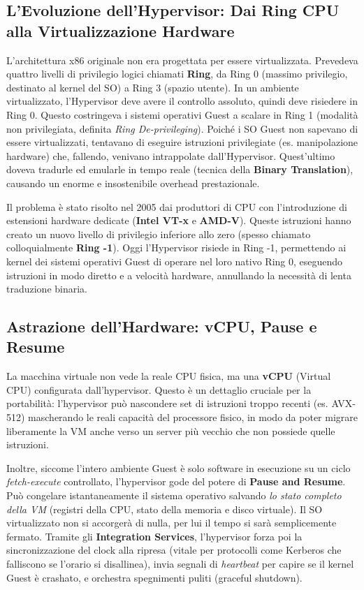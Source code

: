 \subsection{L'Evoluzione dell'Hypervisor: Dai Ring CPU alla Virtualizzazione Hardware}
L'architettura x86 originale non era progettata per essere virtualizzata. Prevedeva quattro livelli di privilegio logici chiamati \textbf{Ring}, da Ring 0 (massimo privilegio, destinato al kernel del SO) a Ring 3 (spazio utente). 
In un ambiente virtualizzato, l'Hypervisor deve avere il controllo assoluto, quindi deve risiedere in Ring 0. Questo costringeva i sistemi operativi Guest a scalare in Ring 1 (modalità non privilegiata, definita \textit{Ring De-privileging}). Poiché i SO Guest non sapevano di essere virtualizzati, tentavano di eseguire istruzioni privilegiate (es. manipolazione hardware) che, fallendo, venivano intrappolate dall'Hypervisor. Quest'ultimo doveva tradurle ed emularle in tempo reale (tecnica della \textbf{Binary Translation}), causando un enorme e insostenibile overhead prestazionale.

Il problema è stato risolto nel 2005 dai produttori di CPU con l'introduzione di estensioni hardware dedicate (\textbf{Intel VT-x} e \textbf{AMD-V}). Queste istruzioni hanno creato un nuovo livello di privilegio inferiore allo zero (spesso chiamato colloquialmente \textbf{Ring -1}). Oggi l'Hypervisor risiede in Ring -1, permettendo ai kernel dei sistemi operativi Guest di operare nel loro nativo Ring 0, eseguendo istruzioni in modo diretto e a velocità hardware, annullando la necessità di lenta traduzione binaria.

\subsection{Astrazione dell'Hardware: vCPU, Pause e Resume}
La macchina virtuale non vede la reale CPU fisica, ma una \textbf{vCPU} (Virtual CPU) configurata dall'hypervisor. Questo è un dettaglio cruciale per la portabilità: l'hypervisor può nascondere set di istruzioni troppo recenti (es. AVX-512) mascherando le reali capacità del processore fisico, in modo da poter migrare liberamente la VM anche verso un server più vecchio che non possiede quelle istruzioni. 

Inoltre, siccome l'intero ambiente Guest è solo software in esecuzione su un ciclo \textit{fetch-execute} controllato, l'hypervisor gode del potere di \textbf{Pause and Resume}. Può congelare istantaneamente il sistema operativo salvando \textit{lo stato completo della VM} (registri della CPU, stato della memoria e disco virtuale). Il SO virtualizzato non si accorgerà di nulla, per lui il tempo si sarà semplicemente fermato. 
Tramite gli \textbf{Integration Services}, l'hypervisor forza poi la sincronizzazione del clock alla ripresa (vitale per protocolli come Kerberos che falliscono se l'orario si disallinea), invia segnali di \textit{heartbeat} per capire se il kernel Guest è crashato, e orchestra spegnimenti puliti (graceful shutdown).

